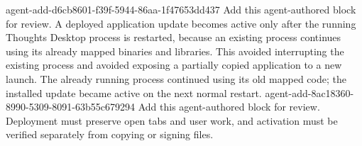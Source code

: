 \agentProposedEdit
  {agent-add-d6cb8601-f39f-5944-86aa-1f47653dd437}
  {Add this agent-authored block for review.}
  {}
  {A deployed application update becomes active only after the running Thoughts Desktop process is restarted, because an existing process continues using its already mapped binaries and libraries.}
This avoided interrupting the existing process and avoided exposing a partially copied application to a new launch.
The already running process continued using its old mapped code; the installed update became active on the next normal restart.
\agentProposedEdit
  {agent-add-8ac18360-8990-5309-8091-63b55c679294}
  {Add this agent-authored block for review.}
  {}
  {Deployment must preserve open tabs and user work, and activation must be verified separately from copying or signing files.}


